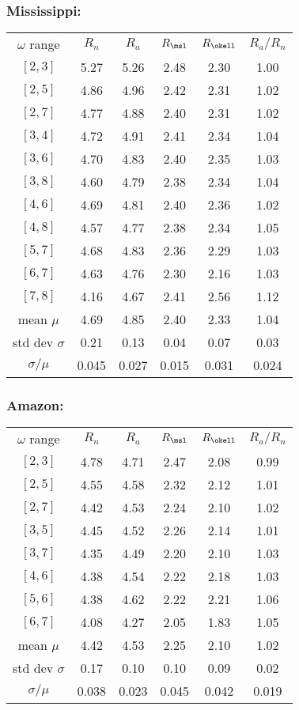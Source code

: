 \begin{frame}[label=]
  \frametitle{Mississippi:}

  \settablerowcolours
  \begin{tabular}{cccccc}
    $\omega$ range & $R_n$ & $R_a$ & $R_\msl$ & $R_{\okell}$ & $R_a/R_n$ \\
    $[2,3]$ & 5.27 & 5.26 & 2.48 & 2.30 & 1.00 \\
    $[2,5]$ & 4.86 & 4.96 & 2.42 & 2.31 & 1.02 \\
    $[2,7]$ & 4.77 & 4.88 & 2.40 & 2.31 & 1.02 \\
    $[3,4]$ & 4.72 & 4.91 & 2.41 & 2.34 & 1.04 \\
    $[3,6]$ & 4.70 & 4.83 & 2.40 & 2.35 & 1.03 \\
    $[3,8]$ & 4.60 & 4.79 & 2.38 & 2.34 & 1.04 \\
    $[4,6]$ & 4.69 & 4.81 & 2.40 & 2.36 & 1.02 \\
    $[4,8]$ & 4.57 & 4.77 & 2.38 & 2.34 & 1.05 \\
    $[5,7]$ & 4.68 & 4.83 & 2.36 & 2.29 & 1.03 \\
    $[6,7]$ & 4.63 & 4.76 & 2.30 & 2.16 & 1.03 \\
    $[7,8]$ & 4.16 & 4.67 & 2.41 & 2.56 & 1.12 \\
    mean $\mu$ & 4.69 & 4.85 & 2.40 & 2.33 & 1.04 \\
    std dev $\sigma$ & 0.21 &  0.13 & 0.04 & 0.07 & 0.03 \\
    $\sigma/\mu$ & 0.045 &  0.027 & 0.015 & 0.031 & 0.024 \\
  \end{tabular}
\end{frame}

\begin{frame}[label=]
   \frametitle{Amazon:}

  \settablerowcolours
   \begin{tabular}{cccccc}
     $\omega$ range & $R_n$ & $R_a$ & $R_\msl$ & $R_{\okell}$ & $R_a/R_n$ \\
     $[2,3]$ & 4.78 & 4.71 & 2.47 & 2.08 & 0.99 \\
     $[2,5]$ & 4.55 & 4.58 & 2.32 & 2.12 & 1.01 \\
     $[2,7]$ & 4.42 & 4.53 & 2.24 & 2.10 & 1.02 \\
     $[3,5]$ & 4.45 & 4.52 & 2.26 & 2.14 & 1.01 \\
     $[3,7]$ & 4.35 & 4.49 & 2.20 & 2.10 & 1.03 \\
     $[4,6]$ & 4.38 & 4.54 & 2.22 & 2.18 & 1.03 \\
     $[5,6]$ & 4.38 & 4.62 & 2.22 & 2.21 & 1.06 \\
     $[6,7]$ & 4.08 & 4.27 & 2.05 & 1.83 & 1.05 \\
     mean $\mu$ & 4.42 & 4.53 & 2.25 & 2.10 & 1.02 \\
     std dev $\sigma$ & 0.17 &  0.10 & 0.10 & 0.09 & 0.02 \\
     $\sigma/\mu$ & 0.038 &  0.023 & 0.045 & 0.042 & 0.019 \\
   \end{tabular}
\end{frame}


